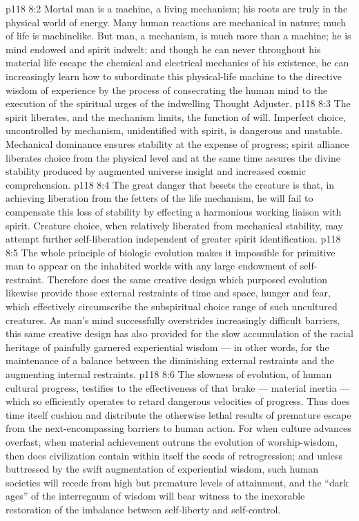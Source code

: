 \vs p118 8:2 Mortal man is a machine, a living mechanism; his roots are truly in the physical world of energy. Many human reactions are mechanical in nature; much of life is machinelike. But man, a mechanism, is much more than a machine; he is mind endowed and spirit indwelt; and though he can never throughout his material life escape the chemical and electrical mechanics of his existence, he can increasingly learn how to subordinate this physical\hyp{}life machine to the directive wisdom of experience by the process of consecrating the human mind to the execution of the spiritual urges of the indwelling Thought Adjuster.
\vs p118 8:3 \pc The spirit liberates, and the mechanism limits, the function of will. Imperfect choice, uncontrolled by mechanism, unidentified with spirit, is dangerous and unstable. Mechanical dominance ensures stability at the expense of progress; spirit alliance liberates choice from the physical level and at the same time assures the divine stability produced by augmented universe insight and increased cosmic comprehension.
\vs p118 8:4 The great danger that besets the creature is that, in achieving liberation from the fetters of the life mechanism, he will fail to compensate this loss of stability by effecting a harmonious working liaison with spirit. Creature choice, when relatively liberated from mechanical stability, may attempt further self\hyp{}liberation independent of greater spirit identification.
\vs p118 8:5 The whole principle of biologic evolution makes it impossible for primitive man to appear on the inhabited worlds with any large endowment of self\hyp{}restraint. Therefore does the same creative design which purposed evolution likewise provide those external restraints of time and space, hunger and fear, which effectively circumscribe the subspiritual choice range of such uncultured creatures. As man’s mind successfully overstrides increasingly difficult barriers, this same creative design has also provided for the slow accumulation of the racial heritage of painfully garnered experiential wisdom --- in other words, for the maintenance of a balance between the diminishing external restraints and the augmenting internal restraints.
\vs p118 8:6 The slowness of evolution, of human cultural progress, testifies to the effectiveness of that brake --- material inertia --- which so efficiently operates to retard dangerous velocities of progress. Thus does time itself cushion and distribute the otherwise lethal results of premature escape from the next\hyp{}encompassing barriers to human action. For when culture advances overfast, when material achievement outruns the evolution of worship\hyp{}wisdom, then does civilization contain within itself the seeds of retrogression; and unless buttressed by the swift augmentation of experiential wisdom, such human societies will recede from high but premature levels of attainment, and the “dark ages” of the interregnum of wisdom will bear witness to the inexorable restoration of the imbalance between self\hyp{}liberty and self\hyp{}control.
